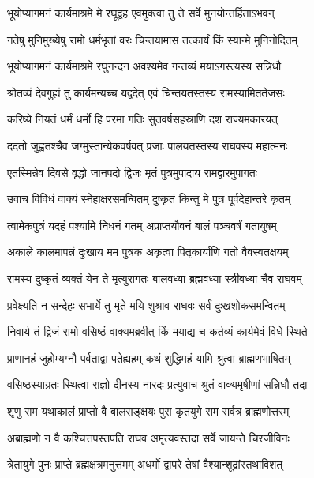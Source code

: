 \twolineshloka
{भूयोप्यागमनं कार्यमाश्रमे मे रघूद्वह}
{एवमुक्त्वा तु ते सर्वे मुनयोन्तर्हिताऽभवन्}%

\twolineshloka
{गतेषु मुनिमुख्येषु रामो धर्मभृतां वरः}
{चिन्तयामास तत्कार्यं किं स्यान्मे मुनिनोदितम्}%

\twolineshloka
{भूयोप्यागमनं कार्यमाश्रमे रघुनन्दन}
{अवश्यमेव गन्तव्यं मयाऽगस्त्यस्य सन्निधौ}%

\twolineshloka
{श्रोतव्यं देवगुह्यं तु कार्यमन्यच्च यद्वदेत्}
{एवं चिन्तयतस्तस्य रामस्यामिततेजसः}%

\twolineshloka
{करिष्ये नियतं धर्मं धर्मो हि परमा गतिः}
{सुतवर्षसहस्राणि दश राज्यमकारयत्}%

\twolineshloka
{ददतो जुह्वतश्चैव जग्मुस्तान्येकवर्षवत्}
{प्रजाः पालयतस्तस्य राघवस्य महात्मनः}%

\twolineshloka
{एतस्मिन्नेव दिवसे वृद्धो जानपदो द्विजः}
{मृतं पुत्रमुपादाय रामद्वारमुपागतः}%

\twolineshloka
{उवाच विविधं वाक्यं स्नेहाक्षरसमन्वितम्}
{दुष्कृतं किन्तु मे पुत्र पूर्वदेहान्तरे कृतम्}%

\twolineshloka
{त्वामेकपुत्रं यदहं पश्यामि निधनं गतम्}
{अप्राप्तयौवनं बालं पञ्चवर्षं गतायुषम्}%

\twolineshloka
{अकाले कालमापन्नं दुःखाय मम पुत्रक}
{अकृत्वा पितृकार्याणि गतो वैवस्वतक्षयम्}%

\twolineshloka
{रामस्य दुष्कृतं व्यक्तं येन ते मृत्युरागतः}
{बालवध्या ब्रह्मवध्या स्त्रीवध्या चैव राघवम्}%

\twolineshloka
{प्रवेक्ष्यति न सन्देहः सभार्ये तु मृते मयि}
{शुश्राव राघवः सर्वं दुःखशोकसमन्वितम्}%

\twolineshloka
{निवार्य तं द्विजं रामो वसिष्ठं वाक्यमब्रवीत्}
{किं मयाद्य च कर्तव्यं कार्यमेवं विधे स्थिते}%

\twolineshloka
{प्राणानहं जुहोम्यग्नौ पर्वताद्वा पतेह्यहम्}
{कथं शुद्धिमहं यामि श्रुत्वा ब्राह्मणभाषितम्}%

\twolineshloka
{वसिष्ठस्याग्रतः स्थित्वा राज्ञो दीनस्य नारदः}
{प्रत्युवाच श्रुतं वाक्यमृषीणां सन्निधौ तदा}%

\twolineshloka
{शृणु राम यथाकालं प्राप्तो वै बालसङ्क्षयः}
{पुरा कृतयुगे राम सर्वत्र ब्राह्मणोत्तरम्}%

\twolineshloka
{अब्राह्मणो न वै कश्चित्तपस्तपति राघव}
{अमृत्यवस्तदा सर्वे जायन्ते चिरजीविनः}%

\twolineshloka
{त्रेतायुगे पुनः प्राप्ते ब्रह्मक्षत्रमनुत्तमम्}
{अधर्मो द्वापरे तेषां वैश्यान्शूद्रांस्तथाविशत्}%


